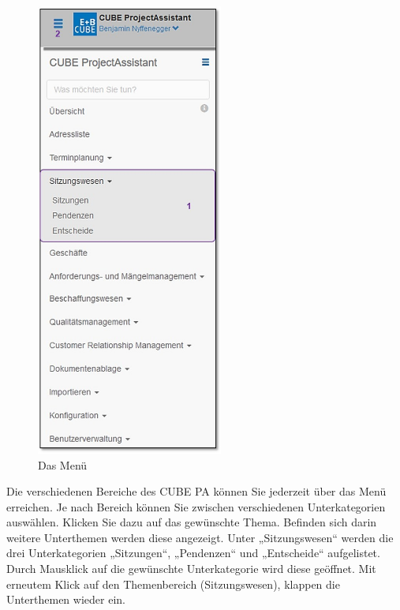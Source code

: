 \begin{figure}   %
  \vspace{-25pt}      %
  \begin{center}
    \includegraphics[height=150mm]{../chapters/01_Einfuehrung/pictures/1-3-1_Menuuebersicht_oSitzungswesen.jpg}
  \end{center}
  \vspace{-20pt}
  \caption{Das Menü}
  \vspace{-10pt}
\end{figure}
Die verschiedenen Bereiche des CUBE PA können Sie jederzeit über das Menü erreichen. Je nach Bereich können Sie zwischen verschiedenen Unterkategorien auswählen. Klicken Sie dazu auf das gewünschte Thema. Befinden sich darin weitere Unterthemen werden diese angezeigt. Unter „Sitzungswesen“  werden die drei Unterkategorien „Sitzungen“, „Pendenzen“ und „Entscheide“ aufgelistet. Durch Mausklick auf die gewünschte Unterkategorie wird diese geöffnet. Mit erneutem Klick auf den Themenbereich (Sitzungswesen), klappen die Unterthemen wieder ein. 

